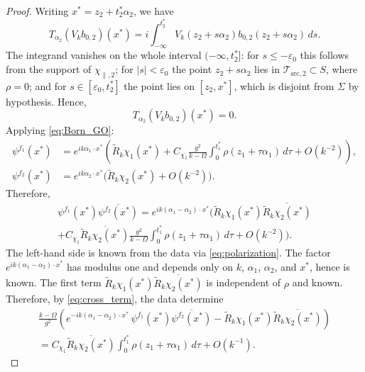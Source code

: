 \documentclass[12pt,a4paper]{amsart}
\numberwithin{equation}{section}
\theoremstyle{plain}
\theoremstyle{definition}
\begin{document}
\begin{proof}
Writing $x^*=z_2+t_2^*\alpha_2$, we have
\begin{equation*}
    T_{\alpha_2}(V_k b_{0,2})(x^*)
    =
    i\int_{-\infty}^{t_2^*}
    V_k(z_2+s\alpha_2)b_{0,2}(z_2+s\alpha_2)\,ds.
\end{equation*}
The integrand vanishes on the whole interval $(-\infty,t_2^*]$: for
$s\leq-\varepsilon_0$ this follows from the support of
$\chi_{\parallel,2}$; for $|s|<\varepsilon_0$ the point
$z_2+s\alpha_2$ lies in $\mathcal{T}_{\mathrm{src},2}\subset S$, where $\rho=0$;
and for $s\in[\varepsilon_0,t_2^*]$ the point lies on $[z_2,x^*]$,
which is disjoint from $\Sigma$ by hypothesis. Hence,
\begin{equation*}
    T_{\alpha_2}(V_k b_{0,2})(x^*)=0.
\end{equation*}
Applying \eqref{eq:Born_GO}:
\begin{align*}
    \psi^{f_1}(x^*)
    &= e^{ik\alpha_1\cdot x^*}\left(
    \widetilde{R}_k \chi_1(x^*)
    + C_{\chi_1}\frac{g^2}{k-\Omega}\int_0^{t_1^*}\rho(z_1+\tau\alpha_1)\,d\tau
    + O(k^{-2})\right),\\
    \psi^{f_2}(x^*)
    &= e^{ik\alpha_2\cdot x^*}\bigl(
    \widetilde{R}_k \chi_2(x^*) + O(k^{-2})\bigr).
\end{align*}
Therefore,
\begin{multline}\label{eq:cross_term}
    \psi^{f_1}(x^*) \overline{\psi^{f_2}(x^*)}
    = e^{ik(\alpha_1-\alpha_2)\cdot x^*}
    \Biggl(
    \widetilde{R}_k \chi_1(x^*) \overline{\widetilde{R}_k \chi_2(x^*)}\\
    + C_{\chi_1} \overline{\widetilde{R}_k \chi_2(x^*)}\frac{g^2}{k-\Omega}
    \int_0^{t_1^*}\rho(z_1+\tau\alpha_1)\,d\tau
    + O(k^{-2})
    \Biggr).
\end{multline}
The left-hand side is known from the data via \eqref{eq:polarization}.
The factor $e^{ik(\alpha_1-\alpha_2)\cdot x^*}$ has modulus one and depends only
on $k$, $\alpha_1$, $\alpha_2$, and $x^*$, hence is known. The first term
$\widetilde{R}_k\chi_1(x^*)\overline{\widetilde{R}_k\chi_2(x^*)}$ is independent of
$\rho$ and known. Therefore, by \eqref{eq:cross_term}, the data determine
\begin{multline*}
    \frac{k-\Omega}{g^2}
    \left(
    e^{-ik(\alpha_1-\alpha_2)\cdot x^*}\,
    \psi^{f_1}(x^*)\overline{\psi^{f_2}(x^*)}
    - \widetilde{R}_k\chi_1(x^*)\overline{\widetilde{R}_k\chi_2(x^*)}
    \right)\\
    = C_{\chi_1}\overline{\widetilde{R}_k\chi_2(x^*)}
    \int_0^{t_1^*}\rho(z_1+\tau\alpha_1)\,d\tau + O(k^{-1}).

\end{multline*}
\end{proof}
\end{document}
